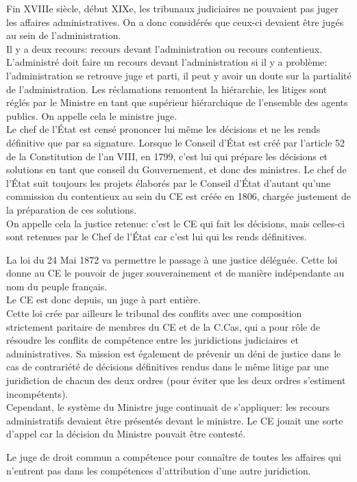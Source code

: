 \documentclass[12pt, a4paper, openany]{book}
\begin{document}
Fin XVIIIe siècle, début XIXe, les tribunaux judiciaires ne pouvaient pas juger les affaires administratives. On a donc considérés que ceux-ci devaient être jugés au sein de l'administration. \\
Il y a deux recours: recours devant l'administration ou recours contentieux. L'administré doit faire un recours devant l'administration si il y a problème: l'administration se retrouve juge et parti, il peut y avoir un doute sur la partialité de l'administration. Les réclamations remontent la hiérarchie, les litiges sont réglés par le Ministre en tant que supérieur hiérarchique de l'ensemble des agents publics. On appelle cela le ministre juge. \\
Le chef de l'État est censé prononcer lui même les décisions et ne les rends définitive que par sa signature. Lorsque le Conseil d'État est créé par l'article 52 de la Constitution de l'an VIII, en 1799, c'est lui qui prépare les décisions et solutions en tant que conseil du Gouvernement, et donc des ministres. Le chef de l'État suit toujours les projets élaborés par le Conseil d'État d'autant qu'une commission du contentieux au sein du CE est créée en 1806, chargée justement de la préparation de ces solutions. \\
On appelle cela la justice retenue: c'est le CE qui fait les décisions, mais celles-ci sont retenues par le Chef de l'État car c'est lui qui les rends définitives.


La loi du 24 Mai 1872 va permettre le passage à une justice déléguée. Cette loi donne au CE le pouvoir de juger souverainement et de manière indépendante au nom du peuple français. \\
Le CE est donc depuis, un juge à part entière. \\
Cette loi crée par ailleurs le tribunal des conflits avec une composition strictement paritaire de membres du CE et de la C.Cas, qui a pour rôle de résoudre les conflits de compétence entre les juridictions judiciaires et administratives. Sa mission est également de prévenir un déni de justice dans le cas de contrariété de décisions définitives rendus dans le même litige par une juridiction de chacun des deux ordres (pour éviter que les deux ordres s'estiment incompétents). \\
Cependant, le système du Ministre juge continuait de s'appliquer: les recours administratifs devaient être présentés devant le ministre. Le CE jouait une sorte d'appel car la décision du Ministre pouvait être contesté.


Le juge de droit commun a compétence pour connaître de toutes les affaires qui n'entrent pas dans les compétences d'attribution d'une autre juridiction.
\end{document}
